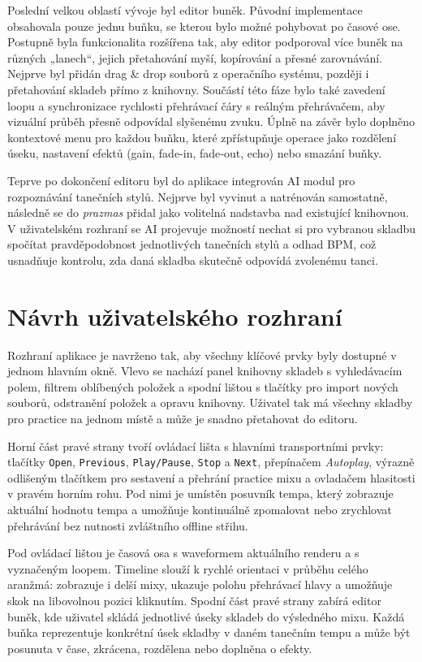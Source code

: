 \documentclass[12pt, a4paper,
]{report}
\begin{document}
Poslední velkou oblastí vývoje byl editor buněk. Původní implementace obsahovala pouze jednu buňku, se kterou bylo možné pohybovat po časové ose. Postupně byla funkcionalita rozšířena tak, aby editor podporoval více buněk na různých „lanech“, jejich přetahování myší, kopírování a přesné zarovnávání. Nejprve byl přidán drag \& drop souborů z operačního systému, později i přetahování skladeb přímo z knihovny. Součástí této fáze bylo také zavedení loopu a synchronizace rychlosti přehrávací čáry s reálným přehrávačem, aby vizuální průběh přesně odpovídal slyšenému zvuku. Úplně na závěr bylo doplněno kontextové menu pro každou buňku, které zpřístupňuje operace jako rozdělení úseku, nastavení efektů (gain, fade‑in, fade‑out, echo) nebo smazání buňky.

Teprve po dokončení editoru byl do aplikace integrován AI modul pro rozpoznávání tanečních stylů. Nejprve byl vyvinut a natrénován samostatně, následně se do \textit{prazmas} přidal jako volitelná nadstavba nad existující knihovnou. V uživatelském rozhraní se AI projevuje možností nechat si pro vybranou skladbu spočítat pravděpodobnost jednotlivých tanečních stylů a odhad BPM, což usnadňuje kontrolu, zda daná skladba skutečně odpovídá zvolenému tanci.

\section{Návrh uživatelského rozhraní}

Rozhraní aplikace je navrženo tak, aby všechny klíčové prvky byly dostupné v jednom hlavním okně. Vlevo se nachází panel knihovny skladeb s vyhledávacím polem, filtrem oblíbených položek a spodní lištou s tlačítky pro import nových souborů, odstranění položek a opravu knihovny. Uživatel tak má všechny skladby pro practice na jednom místě a může je snadno přetahovat do editoru.

Horní část pravé strany tvoří ovládací lišta s hlavními transportními prvky: tlačítky \texttt{Open}, \texttt{Previous}, \texttt{Play/Pause}, \texttt{Stop} a \texttt{Next}, přepínačem \emph{Autoplay}, výrazně odlišeným tlačítkem pro sestavení a přehrání practice mixu a ovladačem hlasitosti v pravém horním rohu. Pod nimi je umístěn posuvník tempa, který zobrazuje aktuální hodnotu tempa a umožňuje kontinuálně zpomalovat nebo zrychlovat přehrávání bez nutnosti zvláštního offline střihu.

Pod ovládací lištou je časová osa s waveformem aktuálního renderu a s vyznačeným loopem. Timeline slouží k rychlé orientaci v průběhu celého aranžmá: zobrazuje i delší mixy, ukazuje polohu přehrávací hlavy a umožňuje skok na libovolnou pozici kliknutím. Spodní část pravé strany zabírá editor buněk, kde uživatel skládá jednotlivé úseky skladeb do výsledného mixu. Každá buňka reprezentuje konkrétní úsek skladby v daném tanečním tempu a může být posunuta v čase, zkrácena, rozdělena nebo doplněna o efekty.
\end{document}
